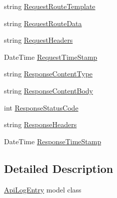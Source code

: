 \begin{DoxyCompactItemize}
string \hyperlink{class_restaurant_reviews_1_1_data_1_1_api_log_entry_a8b0c404d4040f34430db4bd78d7a7603}{Request\+Route\+Template}
\item 
string \hyperlink{class_restaurant_reviews_1_1_data_1_1_api_log_entry_a0a0e0a668815f38d252305755e1a4213}{Request\+Route\+Data}
\item 
string \hyperlink{class_restaurant_reviews_1_1_data_1_1_api_log_entry_a666bb09e8a20e4b1665cf1634db45fe2}{Request\+Headers}
\item 
Date\+Time \hyperlink{class_restaurant_reviews_1_1_data_1_1_api_log_entry_a13ef94ec3eb88465daedb6f7b7b1c06b}{Request\+Time\+Stamp}
\item 
string \hyperlink{class_restaurant_reviews_1_1_data_1_1_api_log_entry_a1e0fdcfc278d696e350f451b0b58e02a}{Response\+Content\+Type}
\item 
string \hyperlink{class_restaurant_reviews_1_1_data_1_1_api_log_entry_ac806749114b21cf61ba697fc4cbb6396}{Response\+Content\+Body}
\item 
int \hyperlink{class_restaurant_reviews_1_1_data_1_1_api_log_entry_a08489aeb56939f7fcdcf3d20a92930b6}{Response\+Status\+Code}
\item 
string \hyperlink{class_restaurant_reviews_1_1_data_1_1_api_log_entry_aee6df7f828dddce8b19b58ac05b8b86f}{Response\+Headers}
\item 
Date\+Time \hyperlink{class_restaurant_reviews_1_1_data_1_1_api_log_entry_a715201d4658c27737a30d9a8e3ab4024}{Response\+Time\+Stamp}
\end{DoxyCompactItemize}


\subsection{Detailed Description}
\hyperlink{class_restaurant_reviews_1_1_data_1_1_api_log_entry}{Api\+Log\+Entry} model class 



